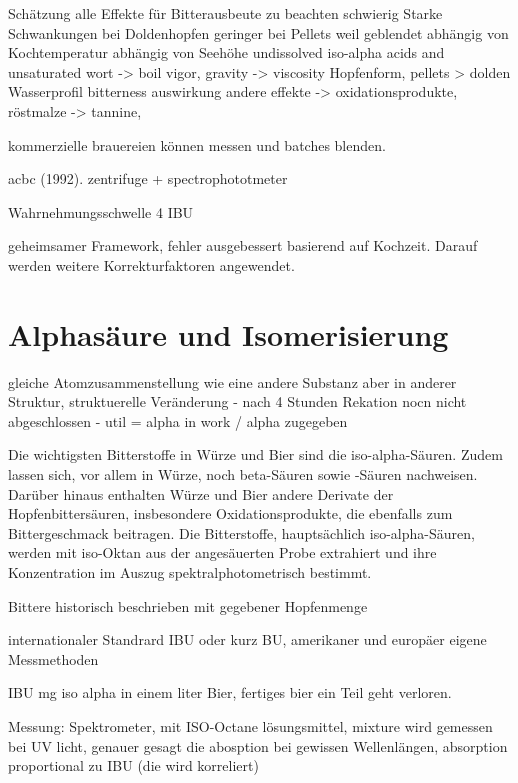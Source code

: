 \documentclass[a4paper,parskip=half]{scrartcl}
\begin{document}
\parencite[58]{Hall1997}
Schätzung alle Effekte für Bitterausbeute zu beachten schwierig
Starke Schwankungen bei Doldenhopfen
geringer bei Pellets weil geblendet
abhängig von Kochtemperatur abhängig von Seehöhe
undissolved iso-alpha acids and unsaturated wort -> boil vigor, gravity -> viscosity
Hopfenform, pellets > dolden
Wasserprofil bitterness auswirkung
andere effekte -> oxidationsprodukte, röstmalze -> tannine, 

kommerzielle brauereien können messen und batches blenden.

acbc (1992). zentrifuge + spectrophototmeter

Wahrnehmungsschwelle 4 IBU

\parencite[59]{Hall1997}
geheimsamer Framework, fehler ausgebessert
basierend auf Kochzeit. Darauf werden weitere
Korrekturfaktoren angewendet.



\section*{Alphasäure und Isomerisierung}

\parencite[51]{Davidson1997} gleiche Atomzusammenstellung wie
eine andere Substanz aber in anderer Struktur, struktuerelle
Veränderung
- nach 4 Stunden Rekation nocn nicht abgeschlossen
- util = alpha in work / alpha zugegeben

\parencite{MEBAK2020}
Die wichtigsten Bitterstoffe in Würze und Bier sind die iso-alpha-Säuren. Zudem lassen sich, vor allem in Würze, noch beta-Säuren sowie -Säuren nachweisen. Darüber hinaus enthalten Würze und Bier andere Derivate der Hopfenbittersäuren, insbesondere Oxidationsprodukte, die ebenfalls zum Bittergeschmack beitragen.
Die Bitterstoffe, hauptsächlich iso-alpha-Säuren, werden mit iso-Oktan aus der
angesäuerten Probe extrahiert und ihre Konzentration im Auszug spektralphotometrisch bestimmt.



\parencite[120\psq]{Garetz1994}
Bittere historisch beschrieben mit gegebener Hopfenmenge

internationaler Standrard IBU oder kurz BU, amerikaner und
europäer eigene Messmethoden
 
\parencite[121]{Garetz1994} 
IBU mg iso alpha in einem liter Bier, fertiges bier
ein Teil geht verloren. 

Messung: Spektrometer, mit ISO-Octane lösungsmittel, mixture
wird gemessen bei UV licht, genauer gesagt die abosption
bei gewissen Wellenlängen, absorption proportional
zu IBU (die wird korreliert)
\end{document}
